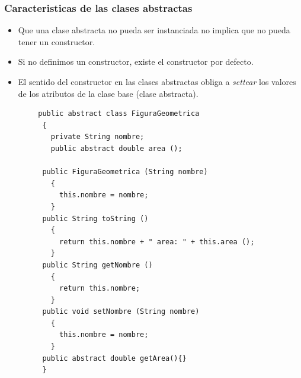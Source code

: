 \documentclass{beamer}
\begin{document}
\begin{frame}[fragile]
\frametitle{Caracteristicas de las clases abstractas}
\begin{footnotesize}
\begin{itemize}[<+->]
\item Que una clase abstracta no pueda ser instanciada no implica que no pueda tener un constructor.
\item Si no definimos un constructor, existe el constructor por defecto.
\item El sentido del constructor en las clases abstractas obliga a \emph{settear} los valores de los atributos de la clase base (clase abstracta).
\end{itemize}
\end{footnotesize}
\pause
\begin{tiny}
\begin{verbatim}
        public abstract class FiguraGeometrica
         {
           private String nombre;
           public abstract double area ();

         public FiguraGeometrica (String nombre)
           {
             this.nombre = nombre;
           }
         public String toString ()
           {
             return this.nombre + " area: " + this.area ();
           }
         public String getNombre ()
           {
             return this.nombre;
           }
         public void setNombre (String nombre)
           {
             this.nombre = nombre;
           }
         public abstract double getArea(){}
         }    
\end{verbatim}
\end{tiny}
\end{frame}
\end{document}
